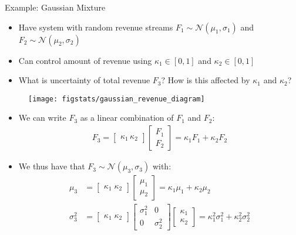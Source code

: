 \documentclass[handout,9pt]{beamer}
\begin{document}
%
\begin{frame}{Example: Gaussian Mixture}
\begin{block}{}
\begin{itemize}
\item Have system with random revenue streams $F_1\sim\mathcal{N}(\mu_1,\sigma_1)$ and $F_2\sim\mathcal{N}(\mu_2,\sigma_2)$
\item Can control amount of revenue using $\kappa_1\in [0,1]$ and $\kappa_2\in [0,1]$
\item What is uncertainty of total revenue $F_3$? How is this affected by $\kappa_1$ and $\kappa_2$? 
\end{itemize}
\end{block}

\begin{figure}[!htb]
    \centering
	\texttt{[image: figstats/gaussian\_revenue\_diagram]}
\end{figure}
\pause 
\begin{itemize}
\item We can write $F_3$ as a linear combination of $F_1$ and $F_2$:
\begin{align*}
F_3=\left[\begin{array}{c} \kappa_1\, \kappa_2
\end{array}\right]\left[\begin{array}{c} F_1\\ F_2
\end{array}\right]=\kappa_1F_1+\kappa_2F_2
\end{align*}
\item We thus have that $F_3\sim\mathcal{N}(\mu_3,\sigma_3)$ with:
\begin{align*}
\mu_3&=\left[\begin{array}{c} \kappa_1\; \kappa_2
\end{array}\right]\left[\begin{array}{c} \mu_1\\ \mu_2
\end{array}\right]=\kappa_1\mu_1+\kappa_2\mu_2\\
\sigma_3^2&=\left[\begin{array}{c} \kappa_1\; \kappa_2
\end{array}\right]\left[\begin{array}{cc} \sigma_1^2&0\\0&\sigma_2^2
\end{array}\right]
\left[\begin{array}{c} \kappa_1\\ \kappa_2
\end{array}\right]=\kappa_1^2\sigma_1^2+\kappa_2^2\sigma_2^2
\end{align*}
\end{itemize}


\end{frame}
\end{document}
